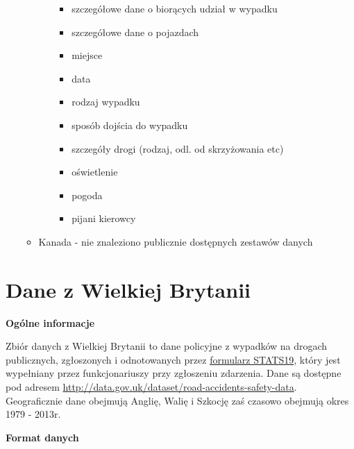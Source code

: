 \begin{enumerate}
\begin{itemize}
\begin{itemize}
      \begin{itemize}
      \itemsep-14pt\parskip0pt
      \item
        szczegółowe dane o biorących udział w wypadku\\
      \item
        szczegółowe dane o pojazdach\\
      \item
        miejsce\\
      \item
        data\\
      \item
        rodzaj wypadku\\
      \item
        sposób dojścia do wypadku\\
      \item
        szczegóły drogi (rodzaj, odl. od skrzyżowania etc)\\
      \item
        oświetlenie\\
      \item
        pogoda\\
      \item
        pijani kierowcy\\
      \end{itemize}
    \end{itemize}
  \item
    Kanada - nie znaleziono publicznie dostępnych zestawów danych
  \end{itemize}
\end{enumerate}

\section{Dane z Wielkiej Brytanii}\label{dane-z-wielkiej-brytanii}

\textbf{Ogólne informacje}

Zbiór danych z Wielkiej Brytanii to dane policyjne z wypadków na drogach
publicznych, zgłoszonych i odnotowanych przez
\href{https://www.gov.uk/government/uploads/system/uploads/attachment_data/file/230590/stats19.pdf}{formularz
STATS19}, który jest wypełniany przez funkcjonariuszy przy zgłoszeniu
zdarzenia. Dane są dostępne pod adresem
\url{http://data.gov.uk/dataset/road-accidents-safety-data}.
Geograficznie dane obejmują Anglię, Walię i Szkocję zaś czasowo obejmują
okres 1979 - 2013r.

\textbf{Format danych}

